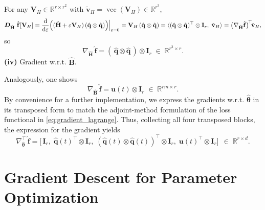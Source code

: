 For any $\mathbf{V}_H\in\mathbb{R}^{r\times r^2}$ with $\tilde{\mathbf{v}}_H=\operatorname{vec}(\mathbf{V}_H)\in\mathbb{R}^{r^3}$,\\
$$\bm{D}_{\hat{\mathbf{H}}}~\hat{\mathbf{f}}[\mathbf{V}_H]=\dv{}{\varepsilon}\Bigl((\hat{\mathbf{H}}+\varepsilon\mathbf{V}_H)\,(\hat{\mathbf{q}}\otimes\hat{\mathbf{q}})\Bigr)\Big|_{\varepsilon=0}=\mathbf{V}_H\,(\hat{\mathbf{q}}\otimes\hat{\mathbf{q}})=\langle(\hat{\mathbf{q}}\otimes\hat{\mathbf{q}})^{\top}\otimes\mathbf{I}_r,\;\tilde{\mathbf{v}}_H\rangle=\bigl(\nabla_{\hat{\mathbf{H}}}\hat{\mathbf{f}}\bigr)^{\!\top}\!\tilde{\mathbf{v}}_H,$$
so\\
$$\nabla_{\hat{\mathbf{H}}}\,\hat{\mathbf{f}}=(\,\hat{\mathbf{q}}\otimes\hat{\mathbf{q}}\,)\otimes\mathbf{I}_r\;\in\;\mathbb{R}^{r^3\times r}.$$
\noindent\textbf{(iv)} Gradient w.r.t. $\hat{\mathbf{B}}$.

Analogously, one shows\\
$$\nabla_{\hat{\mathbf{B}}}\,\hat{\mathbf{f}}=\mathbf{u}(t)\otimes\mathbf{I}_r\;\in\;\mathbb{R}^{rm\times r}.$$
By convenience for a further implementation, we express the gradients w.r.t. $\hat{\bm{\theta}}$ in its transposed form to match the adjoint-method formulation of the loss functional in \eqref{eq:gradient_lagrange}.
Thus, collecting all four transposed blocks, the expression for the gradient yields\\
\begin{equation}
  \label{eq:gradient_2}
  \nabla_{\hat{\bm{\theta}}}^{\top}\,\hat{\mathbf{f}}=\bigl[\,\mathbf{I}_r,\;\hat{\mathbf{q}}(t)^{\!\top}\otimes\mathbf{I}_r,\;(\hat{\mathbf{q}}(t)\otimes\hat{\mathbf{q}}(t))^{\!\top}\otimes\mathbf{I}_r,\;\mathbf{u}(t)^{\!\top}\otimes\mathbf{I}_r\bigr]~~\in\;\mathbb{R}^{r\times d}.
\end{equation}

\newpage
\section{Gradient Descent for Parameter Optimization}
\label{sec:gd_opt}

